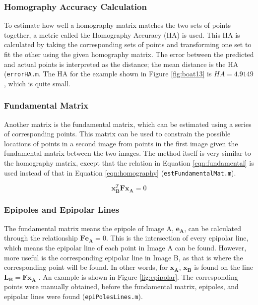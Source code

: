 \documentclass[a4paper, 10pt, conference]{ieeeconf}
\begin{document}
\subsubsection{Homography Accuracy Calculation}
To estimate how well a homography matrix matches the two sets of points together, a metric called the Homography Accuracy (HA) is used. This HA is calculated by taking the corresponding sets of points and transforming one set to fit the other using the given homography matrix. The error between the predicted and actual points is interpreted as the distance; the mean distance is the HA (\texttt{errorHA.m}. The HA for the example shown in Figure \ref{fig:boat13} is $HA=4.9149$, which is quite small.

\subsubsection{Fundamental Matrix}
Another matrix is the fundamental matrix, which can be estimated using a series of corresponding points. This matrix can be used to constrain the possible locations of points in a second image from points in the first image given the fundamental matrix between the two images. The method itself is very similar to the homography matrix, except that the relation in Equation \ref{eqn:fundamental} is used instead of that in Equation \ref{eqn:homography} (\texttt{estFundamentalMat.m}).

\vspace{-0.15cm}
\begin{equation} \label{eqn:fundamental}
    \textbf{x}_\textbf{B}^T\textbf{Fx}_\textbf{A} = 0
\end{equation}
\vspace{-0.5cm}

\subsubsection{Epipoles and Epipolar Lines}

The fundamental matrix means the epipole of Image A, $\textbf{e}_\textbf{A}$, can be calculated through the relationship $\textbf{Fe}_\textbf{A} = 0$. This is the intersection of every epipolar line, which means the epipolar line of each point in Image A can be found. However, more useful is the corresponding epipolar line in Image B, as that is where the corresponding point will be found. In other words, for $\textbf{x}_\textbf{A}$, $\textbf{x}_\textbf{B}$ is found on the line $\textbf{L}_\textbf{B}=\textbf{Fx}_\textbf{A}$ \cite{mit}. An example is shown in Figure \ref{fig:epipolar}. The corresponding points were manually obtained, before the fundamental matrix, epipoles, and epipolar lines were found (\texttt{epiPolesLines.m}). 
\end{document}
